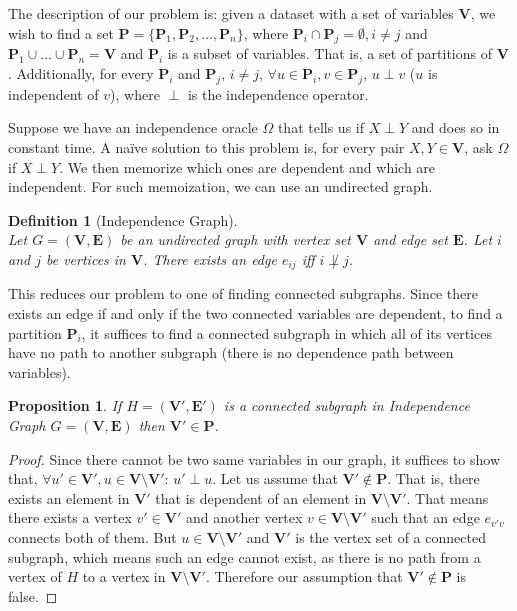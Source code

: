 \documentclass{amsart}
\theoremstyle{plain}
\newcounter{dummy-def}\numberwithin{dummy-def}{section}
\newtheorem{definition}[dummy-def]{Definition}
\newcounter{dummy-thm}\numberwithin{dummy-thm}{section}
\newcounter{dummy-prop}\numberwithin{dummy-prop}{section}
\newtheorem{proposition}[dummy-prop]{Proposition}
\newcounter{dummy-corollary}\numberwithin{dummy-corollary}{section}
\newcounter{dummy-lemma}\numberwithin{dummy-lemma}{section}
\newcounter{dummy-ex}\numberwithin{dummy-ex}{section}
\newcounter{dummy-eg}\numberwithin{dummy-eg}{section}
\numberwithin{equation}{section}
\newcommand{\set}[1]{\mathbf{#1}}
\begin{document}
The description of our problem is: given a dataset with a set of variables $\mathbf{V}$, we wish to
find a set $\set{P}=\{\set{P}_1,\set{P}_2,\ldots,\set{P}_n\}$, where $\set{P}_i\cap
\set{P}_j=\emptyset, i\neq j$ and $\set{P}_1\cup \ldots\cup \set{P}_n=\mathbf{V}$ and $\set{P}_i$
is a subset of variables. That is, a set of partitions of $\mathbf{V}$. Additionally, for every
$\set{P}_i$ and $\set{P}_j$, $i\neq j$, $\forall u\in \set{P}_i, v\in \set{P}_j$, $u\perp v$ ($u$
is independent of $v$), where $\perp$ is the independence operator.

Suppose we have an independence oracle $\Omega$ that tells us if $X\perp Y$ and does so in constant
time. A naïve solution to this problem is, for every pair $X,Y \in \mathbf{V}$, ask $\Omega$ if
$X\perp Y$. We then memorize which ones are dependent and which are independent. For such
memoization, we can use an undirected graph.

\begin{definition}[Independence Graph]~\\
  Let $G=(\set{V},\set{E})$ be an undirected graph with vertex set $\set{V}$ and edge set
  $\set{E}$. Let $i$ and $j$ be vertices in $\set{V}$. There exists an edge $e_{ij}$ iff
  $i\not\perp j$.
\end{definition}

This reduces our problem to one of finding connected subgraphs. Since there exists an edge if and
only if the two connected variables are dependent, to find a partition $\set{P}_i$, it suffices to
find a connected subgraph in which all of its vertices have no path to another subgraph (there is
no dependence path between variables).

\begin{proposition}
  If $H=(\set{V}',\set{E'})$ is a connected subgraph in Independence Graph $G=(\set{V},\set{E})$
  then $\set{V}'\in\set{P}$.
\end{proposition}
\begin{proof}
  Since there cannot be two same variables in our graph, it suffices to show that, $\forall u'\in
  \set{V}', u\in \set{V}\setminus\set{V}'$: $u'\perp u$. Let us assume that $\set{V}'\not\in
  \set{P}$. That is, there exists an element in $\set{V}'$ that is dependent of an element in
  $\set{V}\setminus\set{V}'$. That means there exists a vertex $v'\in\set{V}'$ and another vertex
  $v\in\set{V}\setminus\set{V}'$ such that an edge $e_{v'v}$ connects both of them. But $u\in
  \set{V}\setminus\set{V}'$ and $\set{V}'$ is the vertex set of a connected subgraph, which means
  such an edge cannot exist, as there is no path from a vertex of $H$ to a vertex in $\set{V}
  \setminus\set{V}'$. Therefore our assumption that $\set{V}'\not\in\set{P}$ is false.
\end{proof}
\end{document}
